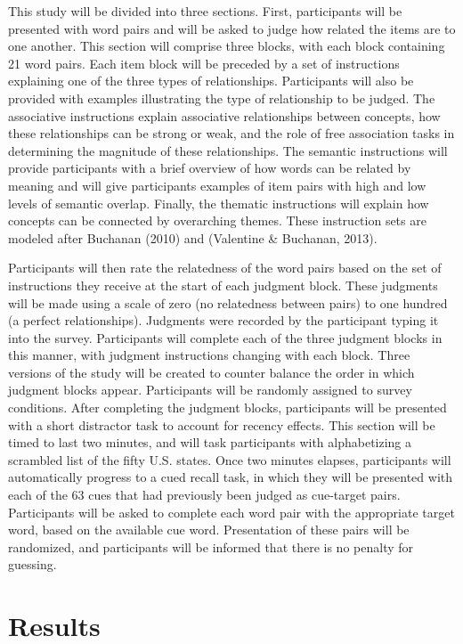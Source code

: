 \documentclass[english,man]{apa6}
\theoremstyle{definition}
\theoremstyle{definition}
\theoremstyle{remark}
\begin{document}
This study will be divided into three sections. First, participants will
be presented with word pairs and will be asked to judge how related the
items are to one another. This section will comprise three blocks, with
each block containing 21 word pairs. Each item block will be preceded by
a set of instructions explaining one of the three types of
relationships. Participants will also be provided with examples
illustrating the type of relationship to be judged. The associative
instructions explain associative relationships between concepts, how
these relationships can be strong or weak, and the role of free
association tasks in determining the magnitude of these relationships.
The semantic instructions will provide participants with a brief
overview of how words can be related by meaning and will give
participants examples of item pairs with high and low levels of semantic
overlap. Finally, the thematic instructions will explain how concepts
can be connected by overarching themes. These instruction sets are
modeled after Buchanan (2010) and (Valentine \& Buchanan, 2013).

Participants will then rate the relatedness of the word pairs based on
the set of instructions they receive at the start of each judgment
block. These judgments will be made using a scale of zero (no
relatedness between pairs) to one hundred (a perfect relationships).
Judgments were recorded by the participant typing it into the survey.
Participants will complete each of the three judgment blocks in this
manner, with judgment instructions changing with each block. Three
versions of the study will be created to counter balance the order in
which judgment blocks appear. Participants will be randomly assigned to
survey conditions. After completing the judgment blocks, participants
will be presented with a short distractor task to account for recency
effects. This section will be timed to last two minutes, and will task
participants with alphabetizing a scrambled list of the fifty U.S.
states. Once two minutes elapses, participants will automatically
progress to a cued recall task, in which they will be presented with
each of the 63 cues that had previously been judged as cue-target pairs.
Participants will be asked to complete each word pair with the
appropriate target word, based on the available cue word. Presentation
of these pairs will be randomized, and participants will be informed
that there is no penalty for guessing.

\section{Results}\label{results}
\end{document}
